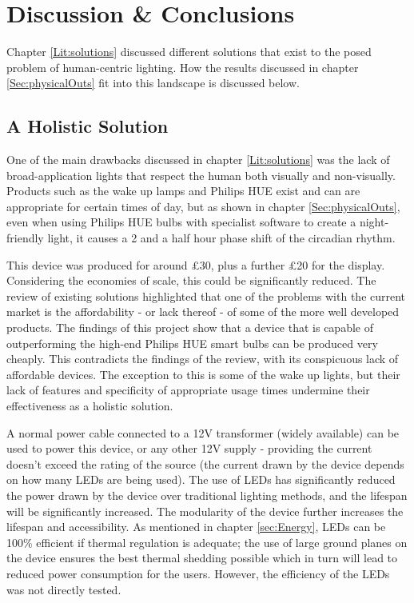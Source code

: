 
\chapter{Discussion \& Conclusions}

Chapter \ref{Lit:solutions} discussed different solutions that exist to the posed problem of human-centric lighting. How the results discussed in chapter \ref{Sec:physicalOuts} fit into this landscape is discussed below.

\section{A Holistic Solution}

One of the main drawbacks discussed in chapter \ref{Lit:solutions} was the lack of broad-application lights that respect the human both visually and non-visually. Products such as the wake up lamps and Philips HUE exist and can are appropriate for certain times of day, but as shown in chapter \ref{Sec:physicalOuts}, even when using Philips HUE bulbs with specialist software to create a night-friendly light, it causes a 2 and a half hour phase shift of the circadian rhythm.

This device was produced for around £30, plus a further £20 for the display. Considering the economies of scale, this could be significantly reduced. The review of existing solutions highlighted that one of the problems with the current market is the affordability - or lack thereof - of some of the more well developed products. The findings of this project show that a device that is capable of outperforming the high-end Philips HUE smart bulbs can be produced very cheaply. This contradicts the findings of the review, with its conspicuous lack of affordable devices. The exception to this is some of the wake up lights, but their lack of features and specificity of appropriate usage times undermine their effectiveness as a holistic solution.

A normal power cable connected to a 12V transformer (widely available) can be used to power this device, or any other 12V supply - providing the current doesn't exceed the rating of the source (the current drawn by the device depends on how many LEDs are being used). The use of LEDs has significantly reduced the power drawn by the device over traditional lighting methods, and the lifespan will be significantly increased. The modularity of the device further increases the lifespan and accessibility. As mentioned in chapter \ref{sec:Energy}, LEDs can be 100\% efficient if thermal regulation is adequate; the use of large ground planes on the device ensures the best thermal shedding possible which in turn will lead to reduced power consumption for the users. However, the efficiency of the LEDs was not directly tested.

